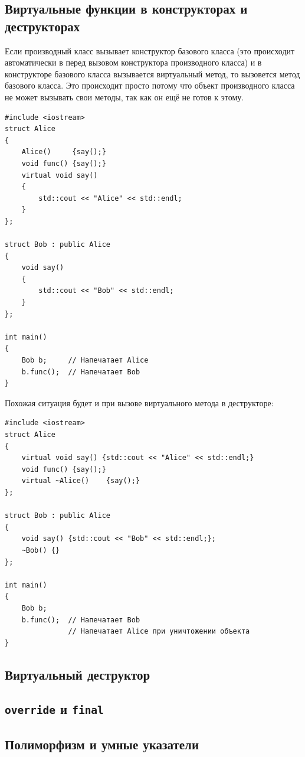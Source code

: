 \documentclass{article}
\begin{document}
\subsection*{Виртуальные функции в конструкторах и деструкторах}
Если производный класс вызывает конструктор базового класса (это происходит автоматически в перед вызовом конструктора производного класса) и в конструкторе базового класса вызывается виртуальный метод, то вызовется метод базового класса.
Это происходит просто потому что объект производного класса не может вызывать свои методы, так как он ещё не готов к этому. 
\begin{lstlisting}[style=csMiptCppBorderStyle]
#include <iostream>
struct Alice 
{
    Alice()     {say();}
    void func() {say();}
    virtual void say() 
    {
    	std::cout << "Alice" << std::endl;
    }
};

struct Bob : public Alice 
{
    void say() 
    {
    	std::cout << "Bob" << std::endl;
    }
};

int main() 
{
    Bob b;     // Напечатает Alice
    b.func();  // Напечатает Bob
}
\end{lstlisting}
Похожая ситуация будет и при вызове виртуального метода в деструкторе:
\begin{lstlisting}[style=csMiptCppBorderStyle]
#include <iostream>
struct Alice 
{
    virtual void say() {std::cout << "Alice" << std::endl;}
    void func() {say();}
    virtual ~Alice()    {say();}
};

struct Bob : public Alice 
{
    void say() {std::cout << "Bob" << std::endl;};
    ~Bob() {}
};

int main() 
{
    Bob b;
    b.func();  // Напечатает Bob
               // Напечатает Alice при уничтожении объекта
}
\end{lstlisting}



\subsection*{Виртуальный деструктор}

\subsection*{\texttt{override} и \texttt{final}}

\subsection*{Полиморфизм и умные указатели}
\end{document}
